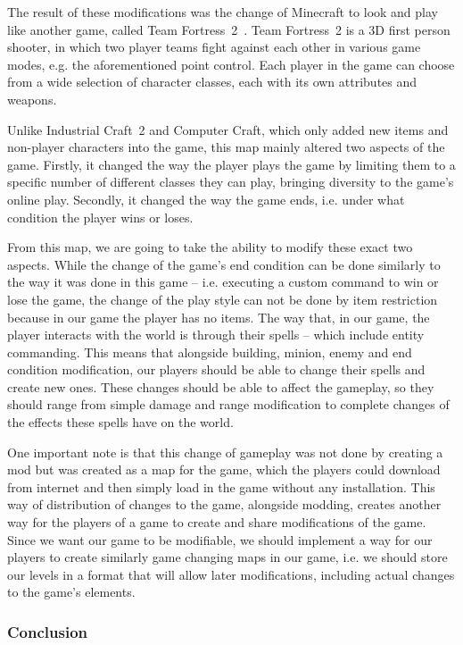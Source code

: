 The result of these modifications was the change of Minecraft to look and play like another game, called 
Team Fortress~2~\cite{TF2}. Team Fortress~2 is a 3D first person shooter, in which two player teams fight against each other in various
game modes, e.g. the aforementioned point control. Each player in the game can choose from a wide selection of character classes, 
each with its own attributes and weapons.

Unlike Industrial Craft~2 and Computer Craft, which only added new items and non-player characters into the game, this map mainly altered
two aspects of the game. Firstly, it changed the way the player plays the game by limiting them to a specific number of different
classes they can play, bringing diversity to the game's online play. Secondly, it changed the way the game ends, i.e. under what condition
the player wins or loses.

From this map, we are going to take the ability to modify these exact two aspects. While the change of the game's end condition can be done
similarly to the way it was done in this game -- i.e. executing a custom command to win or lose the game, the change of the play style can
not be done by item restriction because in our game the player has no items. The way that, in our game, the player interacts with the world
is through their spells -- which include entity commanding. This means that alongside building, minion, enemy and end condition modification,
our players should be able to change their spells and create new ones. These changes should be able to affect the gameplay, so they should
range from simple damage and range modification to complete changes of the effects these spells have on the world.

One important note is that this change of gameplay was not done by creating a mod but was created as a map for the game, which the players
could download from internet and then simply load in the game without any installation.
This way of distribution of changes to the game, alongside modding, creates
another way for the players of a game to create and share modifications of the game. Since we want our game to be modifiable, we should
implement a way for our players to create similarly game changing maps in our game, i.e. we should store our levels
in a format that will allow later modifications, including actual changes to the game's elements.

\subsubsection{Conclusion}

